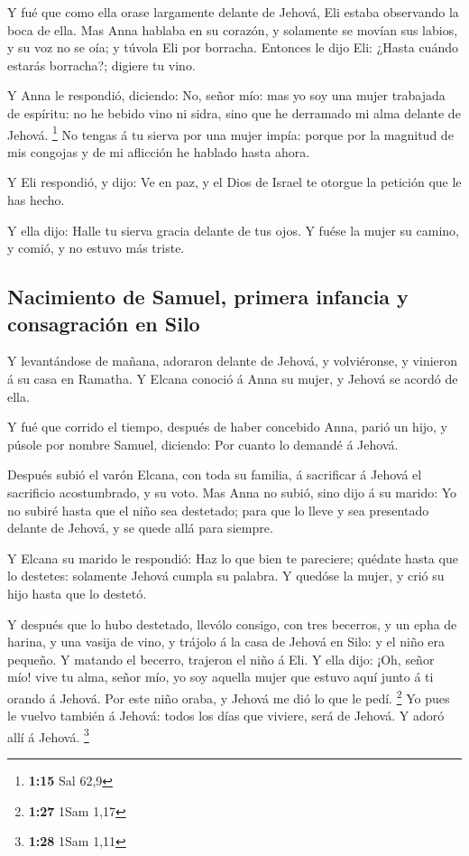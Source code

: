  Y fué que como ella orase largamente delante de Jehová,
Eli estaba observando la boca de ella.  Mas Anna hablaba en
su corazón, y solamente se movían sus labios, y su voz no se oía; y
túvola Eli por borracha.  Entonces le dijo Eli: ¿Hasta
cuándo estarás borracha?; digiere tu vino.

 Y Anna le respondió, diciendo: No, señor mío: mas yo soy
una mujer trabajada de espíritu: no he bebido vino ni sidra, sino que he
derramado mi alma delante de Jehová. \footnote{\textbf{1:15} Sal 62,9}
 No tengas á tu sierva por una mujer impía: porque por la
magnitud de mis congojas y de mi aflicción he hablado hasta ahora.

 Y Eli respondió, y dijo: Ve en paz, y el Dios de Israel te
otorgue la petición que le has hecho.

 Y ella dijo: Halle tu sierva gracia delante de tus ojos. Y
fuése la mujer su camino, y comió, y no estuvo más triste.

\hypertarget{nacimiento-de-samuel-primera-infancia-y-consagraciuxf3n-en-silo}{%
\subsection{Nacimiento de Samuel, primera infancia y consagración en
Silo}\label{nacimiento-de-samuel-primera-infancia-y-consagraciuxf3n-en-silo}}

 Y levantándose de mañana, adoraron delante de Jehová, y
volviéronse, y vinieron á su casa en Ramatha. Y Elcana conoció á Anna su
mujer, y Jehová se acordó de ella.

 Y fué que corrido el tiempo, después de haber concebido
Anna, parió un hijo, y púsole por nombre Samuel, diciendo: Por cuanto lo
demandé á Jehová.

 Después subió el varón Elcana, con toda su familia, á
sacrificar á Jehová el sacrificio acostumbrado, y su voto. 
Mas Anna no subió, sino dijo á su marido: Yo no subiré hasta que el niño
sea destetado; para que lo lleve y sea presentado delante de Jehová, y
se quede allá para siempre.

 Y Elcana su marido le respondió: Haz lo que bien te
pareciere; quédate hasta que lo destetes: solamente Jehová cumpla su
palabra. Y quedóse la mujer, y crió su hijo hasta que lo destetó.

 Y después que lo hubo destetado, llevólo consigo, con tres
becerros, y un epha de harina, y una vasija de vino, y trájolo á la casa
de Jehová en Silo: y el niño era pequeño.  Y matando el
becerro, trajeron el niño á Eli.  Y ella dijo: ¡Oh, señor
mío! vive tu alma, señor mío, yo soy aquella mujer que estuvo aquí junto
á ti orando á Jehová.  Por este niño oraba, y Jehová me dió
lo que le pedí. \footnote{\textbf{1:27} 1Sam 1,17}  Yo pues
le vuelvo también á Jehová: todos los días que viviere, será de Jehová.
Y adoró allí á Jehová. \footnote{\textbf{1:28} 1Sam 1,11}

